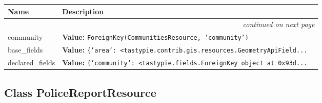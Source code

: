     \vspace{-1cm}
\hspace{\varindent}\begin{longtable}{|p{\varnamewidth}|p{\vardescrwidth}|l}
\cline{1-2}
\cline{1-2} \centering \textbf{Name} & \centering \textbf{Description}& \\
\cline{1-2}
\endhead\cline{1-2}\multicolumn{3}{r}{\small\textit{continued on next page}}\\\endfoot\cline{1-2}
\endlastfoot\raggedright c\-o\-m\-m\-u\-n\-i\-t\-y\- & \raggedright \textbf{Value:} 
{\tt ForeignKey(CommunitiesResource, 'community')}&\\
\cline{1-2}
\raggedright b\-a\-s\-e\-\_\-f\-i\-e\-l\-d\-s\- & \raggedright \textbf{Value:} 
{\tt \texttt{\{}\texttt{'}\texttt{area}\texttt{'}\texttt{: }{\textless}tastypie.contrib.gis.resources.GeometryApiField\texttt{...}}&\\
\cline{1-2}
\raggedright d\-e\-c\-l\-a\-r\-e\-d\-\_\-f\-i\-e\-l\-d\-s\- & \raggedright \textbf{Value:} 
{\tt \texttt{\{}\texttt{'}\texttt{community}\texttt{'}\texttt{: }{\textless}tastypie.fields.ForeignKey object at 0x93d\texttt{...}}&\\
\cline{1-2}
\end{longtable}



\subsection{Class PoliceReportResource}

